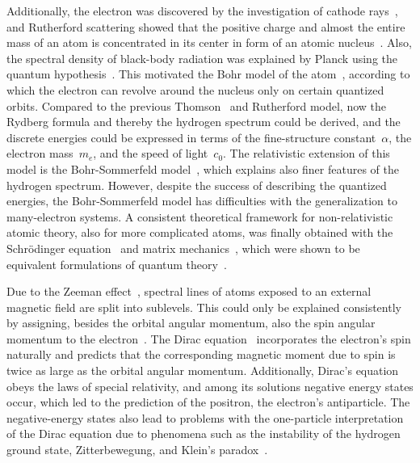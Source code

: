 Additionally, the electron was discovered by the investigation of cathode rays~\cite{thomson1897,rechenberg1997}, and Rutherford scattering showed that the positive charge and almost the entire mass of an atom is concentrated in its center in form of an atomic nucleus~\cite{rutherford1911}. Also, the spectral density of black-body radiation was explained by Planck using the quantum hypothesis~\cite{planck1978}. This motivated the Bohr model of the atom~\cite{bohr1913}, according to which the electron can revolve around the nucleus only on certain quantized orbits. Compared to the previous Thomson~\cite{thomson1904} and Rutherford model, now the Rydberg formula and thereby the hydrogen spectrum could be derived, and the discrete energies could be expressed in terms of the fine-structure constant~$\alpha$, the electron mass~$m_e$, and the speed of light~$c_0$. The relativistic extension of this model is the Bohr-Sommerfeld model~\cite{sommerfeld1916}, which explains also finer features of the hydrogen spectrum.
However, despite the success of describing the quantized energies, the Bohr-Sommerfeld model has difficulties with the generalization to many-electron systems. A consistent theoretical framework for non-relativistic atomic theory, also for more complicated atoms, was finally obtained with the Schrödinger equation~\cite{schrodinger1926_1,schrodinger1926_2,schrodinger1926_3,schrodinger1926_4} and matrix mechanics~\cite{heisenberg1925,born1925,born1926}, which were shown to be equivalent formulations of quantum theory~\cite{schrodinger1926_5}.

Due to the Zeeman effect~\cite{zeeman1896}, spectral lines of atoms exposed to an external magnetic field are split into sublevels. This could only be explained consistently by assigning, besides the orbital angular momentum, also the spin angular momentum to the electron~\cite{uhlenbeck1925}. The Dirac equation~\cite{dirac1928} incorporates the electron's spin naturally and predicts that the corresponding magnetic moment due to spin is twice as large as the orbital angular momentum. Additionally, Dirac's equation obeys the laws of special relativity, and among its solutions negative energy states occur, which led to the prediction of the positron, the electron's antiparticle. The negative-energy states also lead to problems with the one-particle interpretation of the Dirac equation due to phenomena such as the instability of the hydrogen ground state, Zitterbewegung, and Klein's paradox~\cite{the_dirac_eq}.
 
